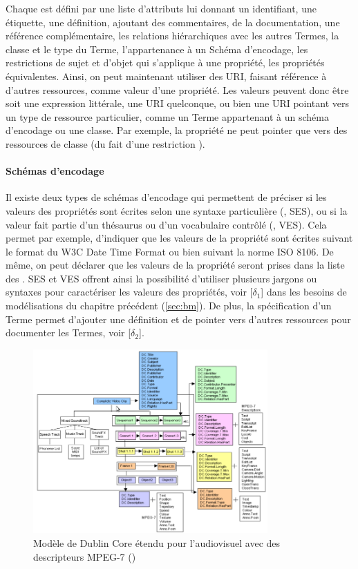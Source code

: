 Chaque  est défini par une liste d'attributs lui donnant un identifiant, une étiquette, une définition, ajoutant des commentaires, de la documentation, une référence complémentaire, les relations hiérarchiques avec les autres Termes, la classe et le type du Terme, l'appartenance à un Schéma d'encodage, les restrictions de sujet et d'objet qui s'applique à une propriété, les propriétés équivalentes.
Ainsi, on peut maintenant utiliser des URI, faisant référence à d'autres ressources, comme valeur d'une propriété.
Les valeurs peuvent donc être soit une expression littérale, une URI quelconque, ou bien une URI pointant vers un type de ressource particulier, comme un Terme appartenant à un schéma d'encodage ou une classe.
Par exemple, la propriété  ne peut pointer que vers des ressources de classe  (du fait d'une restriction ). 


\paragraph{Schémas d'encodage}
Il existe deux types de schémas d'encodage qui permettent de préciser si les valeurs des propriétés sont écrites selon une syntaxe particulière (, SES), ou si la valeur fait partie d'un thésaurus ou d'un vocabulaire contrôlé (, VES).
Cela permet par exemple, d'indiquer que les valeurs de la propriété  sont écrites suivant le format du W3C Date Time Format ou bien suivant la norme ISO 8106. 
De même, on peut déclarer que les valeurs de la propriété  seront prises dans la liste des . 
SES et VES offrent ainsi la possibilité d'utiliser plusieurs jargons ou syntaxes pour caractériser les valeurs des propriétés, voir [$\delta_1$] dans les besoins de modélisations du chapitre précédent (\ref{sec:bm}).
De plus, la spécification d'un Terme permet d'ajouter une définition et de pointer vers d'autres ressources pour documenter les Termes, voir [$\delta_2$].

\begin{figure}[ht!]
\centering
\includegraphics[width=0.8\textwidth]{images/HunterDCMI-MPEG7.png}
\caption{Modèle de Dublin Core étendu pour l'audiovisuel avec des descripteurs MPEG-7 (\cite{Hunter1999})}
\label{img:dcmi-mpeg7}
\end{figure}


